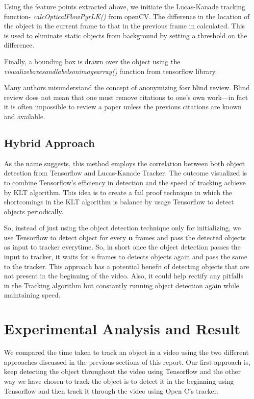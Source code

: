 \documentclass[10pt,twocolumn,letterpaper]{article}
\begin{document}
Using the feature points extracted above, we initiate the Lucas-Kanade tracking function- \textit{calcOpticalFlowPyrLK()} from openCV. The difference in the location of the object in the current frame to that in the previous frame in calculated. This is used to eliminate static objects from background by setting a threshold on the difference. 

Finally, a bounding box is drawn over the object using the \textit{visualize\textunderscore boxes\textunderscore and\textunderscore labels\textunderscore on\textunderscore image\textunderscore array()}  function from tensorflow library.

Many authors misunderstand the concept of anonymizing fosr blind
review.  Blind review does not mean that one must remove
citations to one's own work---in fact it is often impossible to
review a paper unless the previous citations are known and
available.

\subsection{Hybrid Approach}
As the name suggests, this method employs the correlation between both object detection from Tensorflow and Lucas-Kanade Tracker. The outcome visualized is to combine Tensorflow's efficiency in detection and the speed of tracking achieve by KLT algorithm. This idea is to create a fail proof technique in which the shortcomings in the KLT algorithm is balance by usage Tensorflow to detect objects periodically.

So, instead of just using the object detection technique only for initializing, we use Tensorflow to detect object for every \textbf{n} frames and pass the detected objects as input to tracker everytime. So, in short once the object detection passes the input to tracker, it waits for \textit{n} frames to detects objects again and pass the same to the tracker. This approach has a potential benefit of detecting objects that are not present in the beginning of the video. Also, it could help rectify any pitfalls in the Tracking algorithm but constantly running object detection again while maintaining speed.

\section{Experimental Analysis and Result}

  We compared the time taken to track an object in a video using the two different approaches discussed in the previous sections of this report. Our first approach is, keep detecting the object throughout the video using Tensorflow and the other way we have chosen to track the object is to detect it in the beginning using Tensorflow and then track it through the video using Open C’s tracker.
  
\end{document}
